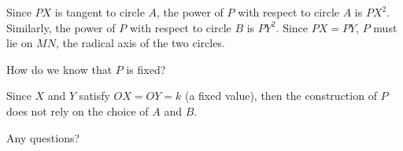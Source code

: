 
Since $PX$ is tangent to circle $A$, the power of $P$ with respect to circle $A$ is $PX^2$. Similarly, the power of $P$ with respect to circle $B$ is $PY^2$. Since $PX = PY$, $P$ must lie on $MN$, the radical axis of the two circles.




How do we know that $P$ is fixed?








Since $X$ and $Y$ satisfy $OX = OY = k$ (a fixed value), then the construction of $P$ does not rely on the choice of $A$ and $B$.

Any questions?



